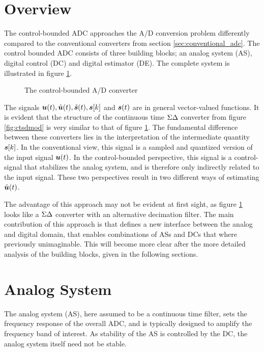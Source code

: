 \section{Overview}
The control-bounded ADC approaches the A/D conversion problem differently compared to the conventional converters from section \ref{sec:conventional_adc}. The control bounded ADC consists of three building blocks; an analog system (AS), digital control (DC) and digital estimator (DE). The complete system is illustrated in figure \ref{fig:cbadc}.

\begin{figure}[htbp]
    
    \centering
    \caption{The control-bounded A/D converter}
    \label{fig:cbadc}
\end{figure}

The signals $\bm{u}(t), \hat{\bm{u}}(t), \tilde{\bm{s}}(t), \bm{s}[k]$ and $\bm{s}(t)$ are in general vector-valued functions. It is evident that the structure of the continuous time $\Sigma\Delta$ converter from figure \ref{fig:ctsdmod} is very similar to that of figure \ref{fig:cbadc}. The fundamental difference between these converters lies in the interpretation of the intermediate quantity $\bm{s}[k]$. In the conventional view, this signal is a sampled and quantized version of the input signal $\bm{u}(t)$. In the control-bounded perspective, this signal is a control-signal that stabilizes the analog system, and is therefore only indirectly related to the input signal. These two perspectives result in two different ways of estimating $\hat{\bm{u}}(t)$.

The advantage of this approach may not be evident at first sight, as figure \ref{fig:cbadc} looks like a $\Sigma\Delta$ converter with an alternative decimation filter. The main contribution of this approach is that defines a new interface between the analog and digital domain, that enables combinations of ASs and DCs that where previously unimaginable. This will become more clear after the more detailed analysis of the building blocks, given in the following sections.

\section{Analog System}
\label{subsec:analog_system}
The analog system (AS), here assumed to be a continuous time filter, sets the frequency response of the overall ADC, and is typically designed to amplify the frequency band of interest. As stability of the AS is controlled by the DC, the analog system itself need not be stable.

